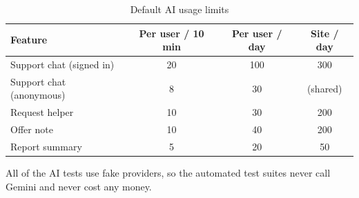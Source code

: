 \documentclass{standalone}
\begin{document}
\begin{table}[htbp]
\centering
\caption{Default AI usage limits}
\label{tab:ailimits}
\small
\begin{tabular}{@{}lccc@{}}
\toprule
\textbf{Feature} & \textbf{Per user / 10 min} & \textbf{Per user / day} & \textbf{Site / day} \\
\midrule
Support chat (signed in) & 20 & 100 & 300 \\
Support chat (anonymous) & 8 & 30 & (shared) \\
Request helper & 10 & 30 & 200 \\
Offer note & 10 & 40 & 200 \\
Report summary & 5 & 20 & 50 \\
\bottomrule
\end{tabular}
\end{table}

All of the AI tests use fake providers, so the automated test suites never call Gemini and never cost any money.
\end{document}
